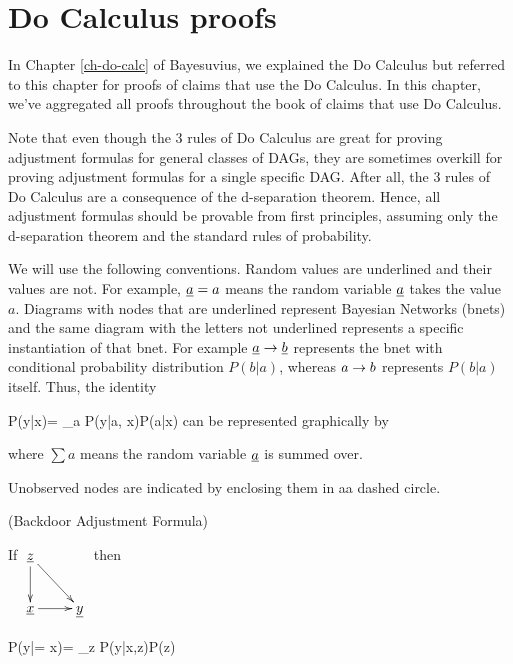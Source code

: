 \chapter{Do Calculus proofs}
\label{ch-do-calc-proofs}

In Chapter \ref{ch-do-calc}
of Bayesuvius,
we explained the Do Calculus
but referred to this
chapter for proofs 
of claims that 
use the Do Calculus.
In this chapter, we've 
aggregated
 all proofs 
throughout the book
of claims that use Do Calculus.

Note that even though the 3
rules of Do Calculus
are great for proving 
adjustment formulas
for general classes of DAGs,
they are sometimes overkill
for proving
 adjustment formulas
for a single specific DAG.
After all,  the
 3 rules of Do Calculus
are a consequence
of the d-separation theorem.
Hence, all adjustment 
formulas should be
provable from first principles,
assuming only
the d-separation theorem
and the standard rules of
probability.

We will use the
 following conventions.
Random values are underlined
and their values are not.
For example, ${\underline{a}}=a$ means 
the random variable
${\underline{a}}$ takes the value $a$.
Diagrams 
with nodes that are 
underlined represent 
Bayesian Networks (bnets)
and the same diagram 
with the letters not underlined
represents a specific
instantiation of that bnet.
For example ${\underline{a}}\rightarrow{\underline{b}}$
represents the bnet with 
conditional probability distribution
$P(b|a)$,
whereas  $a\rightarrow b$
represents $P(b|a)$ itself.
Thus, the identity

\beq
P(y|x)= \sum_a P(y|a, x)P(a|x)
\eeq
can be represented graphically
by

\beq
{}
\eeq
where $\sum a$
means the random variable
${\underline{a}}$ is summed over.

Unobserved nodes are 
indicated by enclosing them
in aa dashed circle.

\begin{claim} (Backdoor
Adjustment Formula)
\label{cl-backdoor-proof}

If 
$
\xymatrix{
{\rvz}\ar[d]\ar[rd]
\\
\rvx\ar[r]&\rvy
}$
then

\beq
P(y|\cald \rvx = x)=
\sum_z
P(y|x,z)P(z)
\eeq
\beq
{}
\eeq
\end{claim}

